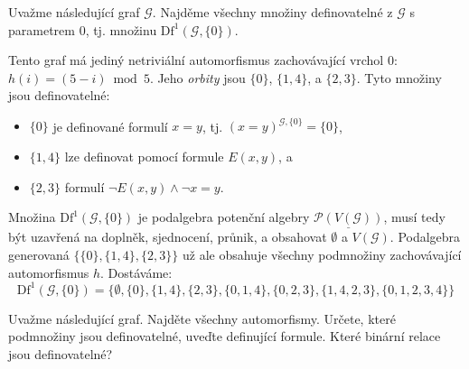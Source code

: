 \begin{example}
    Uvažme následující graf $\mathcal G$. Najděme všechny množiny definovatelné z $\mathcal G$ s parametrem $0$, tj. množinu 
    $\mathrm{Df}^1(\mathcal G,\{0\})$. 
    \begin{center}
    \end{center}
    Tento graf má jediný netriviální automorfismus zachovávající vrchol $0$: $h(i)=(5-i) \bmod 5$. Jeho \emph{orbity} jsou $\{0\}$, $\{1,4\}$, a $\{2,3\}$. Tyto množiny jsou definovatelné:
    \begin{itemize}
        \item $\{0\}$ je definované formulí $x=y$, tj. $(x=y)^{\mathcal G,\{0\}}=\{0\}$,
        \item $\{1,4\}$ lze definovat pomocí formule $E(x,y)$, a
        \item $\{2,3\}$ formulí $\neg E(x,y)\land \neg x=y$.
    \end{itemize}
    Množina $\mathrm{Df}^1(\mathcal G,\{0\})$ je podalgebra potenční algebry $\underline{\mathcal P(V(\mathcal G))}$, musí tedy být uzavřená na doplněk, sjednocení, průnik, a obsahovat $\emptyset$ a $V(\mathcal G)$. Podalgebra generovaná $\{\{0\},\{1,4\},\{2,3\}\}$ už ale obsahuje všechny podmnožiny zachovávající automorfismus $h$. Dostáváme:
    $$
    \mathrm{Df}^1(\mathcal G,\{0\})=\{\emptyset, \{0\}, \{1,4\}, \{2,3\}, \{0,1,4\}, \{0,2,3\}, \{1,4,2,3\}, \{0,1,2,3,4\}\}
    $$
\end{example}

\begin{exercise}
    Uvažme následující graf. Najděte všechny automorfismy. Určete, které podmnožiny jsou definovatelné, uveďte definující formule. Které binární relace jsou definovatelné?
    \begin{center}
    \end{center}
\end{exercise}


